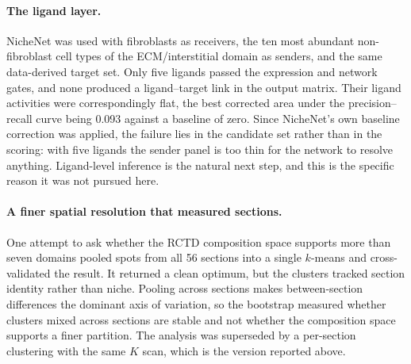\paragraph{The ligand layer.} NicheNet was used with fibroblasts as receivers, the ten most
abundant non-fibroblast cell types of the ECM/interstitial domain as senders, and the same
data-derived target set. Only five ligands passed the expression and network gates, and none
produced a ligand--target link in the output matrix. Their ligand activities were
correspondingly flat, the best corrected area under the precision--recall curve being 0.093
against a baseline of zero. Since NicheNet's own baseline correction was applied, the
failure lies in the candidate set rather than in the scoring: with five ligands the sender
panel is too thin for the network to resolve anything. Ligand-level inference is the natural
next step, and this is the specific reason it was not pursued here.

\paragraph{A finer spatial resolution that measured sections.} One attempt to ask whether the
RCTD composition space supports more than seven domains pooled spots from all 56 sections
into a single $k$-means and cross-validated the result. It returned a clean optimum, but the
clusters tracked section identity rather than niche. Pooling across sections makes
between-section differences the dominant axis of variation, so the bootstrap measured
whether clusters mixed across sections are stable and not whether the composition space
supports a finer partition. The analysis was superseded by a per-section clustering with the
same $K$ scan, which is the version reported above.




